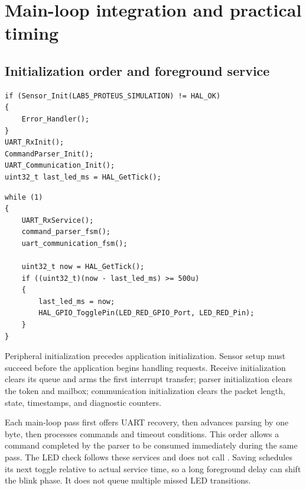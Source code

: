 \documentclass[a4paper]{article}
\newcommand{\code}[1]{\texttt{\detokenize{#1}}}
\newcommand{\topic}[1]{\subsection{#1}}
\begin{document}
\section{Main-loop integration and practical timing}

\topic{Initialization order and foreground service}

\par\noindent\begin{minipage}{\linewidth}
\begin{lstlisting}[caption={Application startup after peripheral initialization},firstnumber=1]
if (Sensor_Init(LAB5_PROTEUS_SIMULATION) != HAL_OK)
{
    Error_Handler();
}
UART_RxInit();
CommandParser_Init();
UART_Communication_Init();
uint32_t last_led_ms = HAL_GetTick();
\end{lstlisting}
\end{minipage}\par

\par\noindent\begin{minipage}{\linewidth}
\begin{lstlisting}[caption={Main-loop services and the independent LED heartbeat},firstnumber=1]
while (1)
{
    UART_RxService();
    command_parser_fsm();
    uart_communication_fsm();

    uint32_t now = HAL_GetTick();
    if ((uint32_t)(now - last_led_ms) >= 500u)
    {
        last_led_ms = now;
        HAL_GPIO_TogglePin(LED_RED_GPIO_Port, LED_RED_Pin);
    }
}
\end{lstlisting}
\end{minipage}\par

Peripheral initialization precedes application initialization. Sensor setup
must succeed before the application begins handling requests. Receive
initialization clears its queue and arms the first interrupt transfer; parser
initialization clears the token and mailbox; communication initialization
clears the packet length, state, timestamps, and diagnostic counters.

Each main-loop pass first offers UART recovery, then advances parsing by one
byte, then processes commands and timeout conditions. This order allows a
command completed by the parser to be consumed immediately during the same
pass. The LED check follows these services and does not call \code{HAL_Delay}.
Saving \code{last_led_ms = now} schedules its next toggle relative to actual
service time, so a long foreground delay can shift the blink phase. It does
not queue multiple missed LED transitions.
\end{document}
